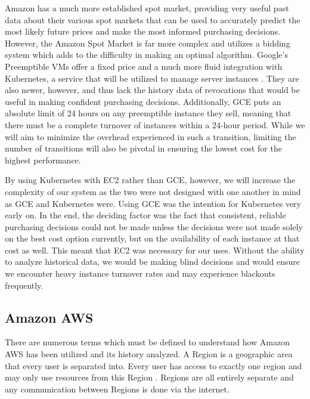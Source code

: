 \documentclass[thesis,proposal]{umassthesis}  %
\begin{document}
Amazon has a much more established spot market, providing very useful past data about their various spot markets that can be used to accurately predict the most likely future prices and make the most informed purchasing decisions. However, the Amazon Spot Market is far more complex and utilizes a bidding system which adds to the difficulty in making an optimal algorithm. Google’s Preemptible VMs offer a fixed price and a much more fluid integration with Kubernetes, a service that will be utilized to manage server instances \cite{introToKubernetes}. They are also newer, however, and thus lack the history data of revocations that would be useful in making confident purchasing decisions. Additionally, GCE puts an absolute limit of 24 hours on any preemptible instance they sell, meaning that there must be a complete turnover of instances within a 24-hour period. While we will aim to minimize the overhead experienced in such a transition, limiting the number of transitions will also be pivotal in ensuring the lowest cost for the highest performance.\par

By using Kubernetes with EC2 rather than GCE, however, we will increase the complexity of our system as the two were not designed with one another in mind as GCE and Kubernetes were. Using GCE was the intention for Kubernetes very early on. In the end, the deciding factor was the fact that consistent, reliable purchasing decisions could not be made unless the decisions were not made solely on the best cost option currently, but on the availability of each instance at that cost as well. This meant that EC2 was necessary for our uses. Without the ability to analyze historical data, we would be making blind decisions and would ensure we encounter heavy instance turnover rates and may experience blackouts frequently.\par


\subsection{Amazon AWS}


There are numerous terms which must be defined to understand how Amazon AWS has been utilized and its history analyzed. A Region is a geographic area that every user is separated into. Every user has access to exactly one region and may only use resources from this Region \cite{ec2RegionsAndAZ}. Regions are all entirely separate and any communication between Regions is done via the internet.\par
\end{document}
